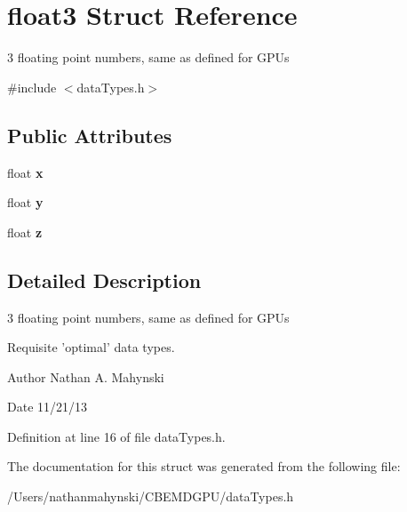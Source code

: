 \hypertarget{structfloat3}{\section{float3 Struct Reference}
\label{structfloat3}
}


3 floating point numbers, same as defined for G\-P\-Us  




{\ttfamily \#include $<$data\-Types.\-h$>$}

\subsection*{Public Attributes}
\begin{DoxyCompactItemize}
\item 
\hypertarget{structfloat3_af621f02abb1c788738fe61ea9807ff9c}{float {\bfseries x}}\label{structfloat3_af621f02abb1c788738fe61ea9807ff9c}

\item 
\hypertarget{structfloat3_aa6147d421a81889971f8c66aa92abf0d}{float {\bfseries y}}\label{structfloat3_aa6147d421a81889971f8c66aa92abf0d}

\item 
\hypertarget{structfloat3_a772dffd42d89f350c5a1b766c4703245}{float {\bfseries z}}\label{structfloat3_a772dffd42d89f350c5a1b766c4703245}

\end{DoxyCompactItemize}


\subsection{Detailed Description}
3 floating point numbers, same as defined for G\-P\-Us 

Requisite 'optimal' data types. \begin{DoxyAuthor}{Author}
Nathan A. Mahynski 
\end{DoxyAuthor}
\begin{DoxyDate}{Date}
11/21/13 
\end{DoxyDate}


Definition at line 16 of file data\-Types.\-h.



The documentation for this struct was generated from the following file\-:\begin{DoxyCompactItemize}
\item 
/\-Users/nathanmahynski/\-C\-B\-E\-M\-D\-G\-P\-U/data\-Types.\-h\end{DoxyCompactItemize}
